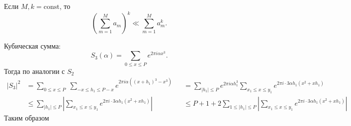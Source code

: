 \documentclass[12pt,a4paper]{article}
\newcommand{\const}{\mathrm{const}}
\begin{document}
    \begin{corollary}
        Если $M, k = \const$, то
        \[\left(\sum_{m=1}^M a_m\right)^k \ll \sum_{m=1}^M a_m^k.\]
    \end{corollary}

    Кубическая сумма:
    \[S_3(\alpha) = \sum_{0 \leqslant x \leqslant P} e^{2\pi i \alpha x^3}.\]
    Тогда по аналогии с $S_2$
    \begin{align*}
        |S_3|^2
        &= \sum_{0 \leqslant x \leqslant P}\; \sum_{-x \leqslant h_1 \leqslant P-x} e^{2\pi i \alpha ((x+h_1)^3 - x^3)}&
        &= \sum_{|h_1| \leqslant P} e^{2\pi i \alpha h_1^3} \sum_{x_1 \leqslant x \leqslant y_1} e^{2\pi i \cdot 3\alpha h_1(x^2 + xh_1)}\\
        &\leqslant \sum_{|h_1| \leqslant P} \left|\sum_{x_1 \leqslant x \leqslant y_1} e^{2\pi i \cdot 3\alpha h_1(x^2 + xh_1)} \right|&
        &\leqslant P+1 + 2\sum_{1 \leqslant |h_1| \leqslant P} \left|\sum_{x_1 \leqslant x \leqslant y_1} e^{2\pi i \cdot 3\alpha h_1(x^2 + xh_1)} \right|
    \end{align*}
    Таким образом
\end{document}
